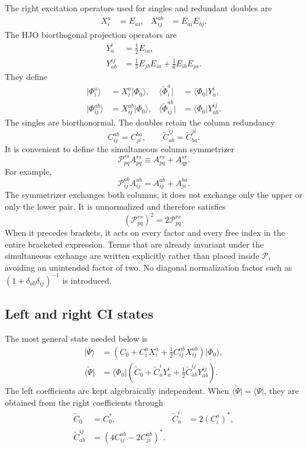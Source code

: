 \documentclass[10pt]{article}
\newcommand{\vac}{\Phi_0}
\newcommand{\tC}{\widetilde{C}}
\newcommand{\tPhi}{\widetilde{\Phi}}
\newcommand{\tPsi}{\widetilde{\Psi}}
\begin{document}
The right excitation operators used for singles and redundant doubles are
\begin{align}
 X_i^a&=E_{ai},
 &
 X_{ij}^{ab}&=E_{ai}E_{bj}.
\end{align}
The HJO biorthogonal projection operators are
\begin{align}
 Y_a^i
 &=\frac12E_{ia},
 \\
 Y_{ab}^{ij}
 &=\frac13E_{jb}E_{ia}+\frac16E_{ib}E_{ja}.
\end{align}
They define
\begin{align}
 \lvert\Phi_i^a\rangle
 &=X_i^a\lvert\vac\rangle,
 &
 \langle\tPhi_i^a\rvert
 &=\langle\vac\rvert Y_a^i,
 \\
 \lvert\Phi_{ij}^{ab}\rangle
 &=X_{ij}^{ab}\lvert\vac\rangle,
 &
 \langle\tPhi_{ij}^{ab}\rvert
 &=\langle\vac\rvert Y_{ab}^{ij}.
\end{align}
The singles are biorthonormal. The doubles retain the column redundancy
\begin{equation}
 C_{ij}^{ab}=C_{ji}^{ba},
 \qquad
 \tC_{ab}^{ij}=\tC_{ba}^{ji}.
\end{equation}
It is convenient to define the simultaneous column symmetrizer
\begin{equation}
 \mathcal P_{pq}^{rs}A_{pq}^{rs}
 \equiv A_{pq}^{rs}+A_{qp}^{sr}.
\end{equation}
For example,
\begin{equation}
 \mathcal P_{ij}^{ab}A_{ij}^{ab}
 =A_{ij}^{ab}+A_{ji}^{ba}.
\end{equation}
The symmetrizer exchanges both columns; it does not exchange only the upper
or only the lower pair. It is unnormalized and therefore satisfies
\begin{equation}
 \left(\mathcal P_{pq}^{rs}\right)^2
 =2\mathcal P_{pq}^{rs}.
\end{equation}
When it precedes brackets, it acts on every factor and every free index in the
entire bracketed expression. Terms that are already invariant under the
simultaneous exchange are written explicitly rather than placed inside
$\mathcal P$, avoiding an unintended factor of two.
No diagonal normalization factor such as
$(1+\delta_{ab}\delta_{ij})^{-1}$ is introduced.

\subsection{Left and right CI states}

The most general state needed below is
\begin{align}
 \lvert\Psi\rangle
 &=\left(
   C_0+C_i^aX_i^a+\frac12C_{ij}^{ab}X_{ij}^{ab}
   \right)\lvert\vac\rangle,
 \\
 \langle\tPsi\rvert
 &=\langle\vac\rvert\left(
   \tC_0+\tC_a^iY_a^i+\frac12\tC_{ab}^{ij}Y_{ab}^{ij}
   \right).
\end{align}
The left coefficients are kept algebraically independent. When
$\langle\tPsi\rvert=\langle\Psi\rvert$, they are obtained from the right
coefficients through
\begin{align}
 \tC_0&=C_0^{*},
 &
 \tC_a^i&=2(C_i^a)^{*},
 \\
 \tC_{ab}^{ij}
 &=\left(4C_{ij}^{ab}-2C_{ji}^{ab}\right)^{*}.
\end{align}
\end{document}

